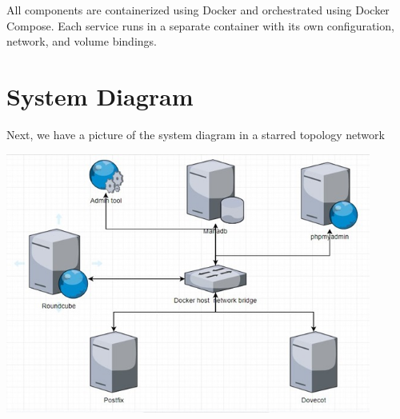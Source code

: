 \documentclass[12pt]{article}
\begin{document}
All components are containerized using Docker and orchestrated using Docker Compose. Each service runs in a separate container with its own configuration, network, and volume bindings.

\section{System Diagram}
Next, we have a picture of the system diagram in a starred topology network
 
\begin{center}
    \includegraphics[width=0.9\textwidth]{diagram.jpeg}
     \label{diagram.jpeg}
\end{center}
\end{document}
